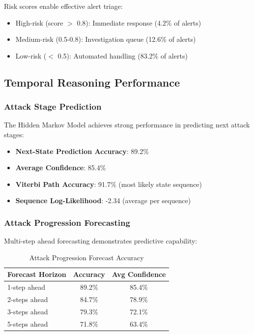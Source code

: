 \documentclass[conference]{IEEEtran}
\begin{document}
Risk scores enable effective alert triage:
\begin{itemize}
    \item High-risk (score $>$ 0.8): Immediate response (4.2\% of alerts)
    \item Medium-risk (0.5-0.8): Investigation queue (12.6\% of alerts)
    \item Low-risk ($<$ 0.5): Automated handling (83.2\% of alerts)
\end{itemize}

\subsection{Temporal Reasoning Performance}

\subsubsection{Attack Stage Prediction}
The Hidden Markov Model achieves strong performance in predicting next attack stages:

\begin{itemize}
    \item \textbf{Next-State Prediction Accuracy}: 89.2\%
    \item \textbf{Average Confidence}: 85.4\%
    \item \textbf{Viterbi Path Accuracy}: 91.7\% (most likely state sequence)
    \item \textbf{Sequence Log-Likelihood}: -2.34 (average per sequence)
\end{itemize}

\subsubsection{Attack Progression Forecasting}
Multi-step ahead forecasting demonstrates predictive capability:

\begin{table}[htbp]
\caption{Attack Progression Forecast Accuracy}
\begin{center}
\begin{tabular}{lcc}
\toprule
\textbf{Forecast Horizon} & \textbf{Accuracy} & \textbf{Avg Confidence} \\
\midrule
1-step ahead & 89.2\% & 85.4\% \\
2-steps ahead & 84.7\% & 78.9\% \\
3-steps ahead & 79.3\% & 72.1\% \\
5-steps ahead & 71.8\% & 63.4\% \\
\bottomrule
\end{tabular}
\label{tab:forecast_accuracy}
\end{center}
\end{table}
\end{document}
